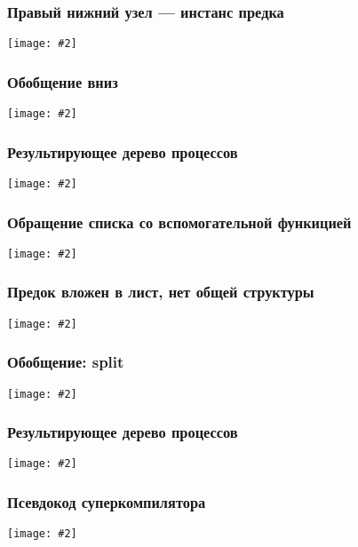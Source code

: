 \documentclass{beamer}
\newcommand{\incimage}[2][0.8]{ 
  \begin{center}   
    \texttt{[image: \#2]}
  \end{center}
  }
\begin{document}
\begin{frame}[fragile]
  \transwipe[direction=90]
  \frametitle{Правый нижний узел --- инстанс предка}


    \incimage{revtreegen1.png}

\end{frame}

\begin{frame}[fragile]
  \transwipe[direction=90]
  \frametitle{Обобщение вниз}


    \incimage{revtreegen2.png}

\end{frame}

\begin{frame}[fragile]
  \transwipe[direction=90]
  \frametitle{Результирующее дерево процессов}


    \incimage{revtreegen3.png}

\end{frame}

\begin{frame}[fragile]
  \transwipe[direction=90]
  \frametitle{Обращение списка со вспомогательной функицией}


    \incimage{revl.png}

\end{frame}

\begin{frame}[fragile]
  \transwipe[direction=90]
  \frametitle{Предок вложен в лист, нет общей структуры}


    \incimage{revltree0.png}

\end{frame}

\begin{frame}[fragile]
  \transwipe[direction=90]
  \frametitle{Обобщение: split}


    \incimage{revltree1.png}

\end{frame}

\begin{frame}[fragile]
  \transwipe[direction=90]
  \frametitle{Результирующее дерево процессов}


    \incimage{revltree2.png}

\end{frame}

\begin{frame}[fragile]
  \transwipe[direction=90]
  \frametitle{Псевдокод суперкомпилятора}


    \incimage{supercompilationcode.png}

\end{frame}
\end{document}

